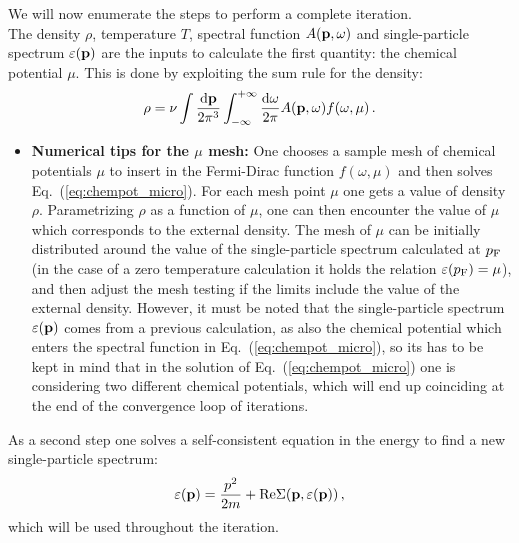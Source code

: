 We will now enumerate the steps to perform a complete iteration.\\
 The density $\rho$, temperature $T$, spectral function $A({\bf p},\omega)$ and single-particle spectrum $\varepsilon({\bf p})$ are the inputs to calculate the first quantity: the chemical potential $\mu$. This is done by exploiting the sum rule for the density:
\begin{equation}
\rho=\nu\int\frac{{\rm d}{\bf p}}{2\pi^3}\int_{-\infty}^{+\infty}\frac{{\rm d}{\omega}}{2\pi}A({\bf p},\omega)f(\omega,\mu)\,.
\label{eq:chempot_micro}
\end{equation}
\begin{itemize}
\item {\bf Numerical tips for the $\mu$ mesh:} One chooses a sample mesh of chemical potentials $\mu$ to insert in the Fermi-Dirac function $f(\omega,\mu)$ and then solves Eq.~(\ref{eq:chempot_micro}). For each mesh point $\mu$ one gets a value of density $\rho$. Parametrizing $\rho$ as a function of $\mu$, one can then encounter the value of $\mu$ which corresponds to the external density. The mesh of $\mu$ can be initially distributed around the value of the single-particle spectrum calculated at $p_{\rm F}$ (in the case of a zero temperature calculation it holds the relation $\varepsilon(p_{\rm F})=\mu$), and then adjust the mesh testing if the limits include the value of the external density. However, it must be noted that the single-particle spectrum $\varepsilon({\bf p})$ comes from a previous calculation, as also the chemical potential which enters the spectral function in Eq.~(\ref{eq:chempot_micro}), so its has to be kept in mind that in the solution of Eq.~(\ref{eq:chempot_micro}) one is considering two different chemical potentials, which will end up coinciding at the end of the convergence loop of iterations.
\end{itemize}

 As a second step one solves a self-consistent equation in the energy to find a new single-particle spectrum:
\begin{equation}
\varepsilon({\bf p})=\frac{p^2}{2m}+{\rm Re}\Sigma({\bf p},\varepsilon({\bf p}))\,,
\end{equation}
which will be used throughout the iteration. 
 

